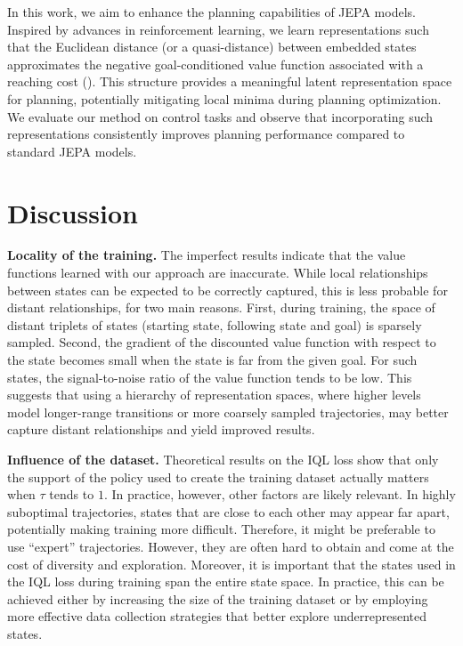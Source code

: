 \documentclass{article} %
\begin{document}
In this work, we aim to enhance the planning capabilities of JEPA models. Inspired by advances in reinforcement learning, we learn representations such that the Euclidean distance (or a quasi-distance) between embedded states approximates the negative goal-conditioned value function associated with a reaching cost (\cite{hilp,park2024hiqlofflinegoalconditionedrl,wang2023optimalgoalreachingreinforcementlearning}). This structure provides a meaningful latent representation space for planning, potentially mitigating local minima during planning optimization. We evaluate our method on control tasks and observe that incorporating such representations consistently improves planning performance compared to standard JEPA models.








\section{Discussion}

\noindent \textbf{Locality of the training.} The imperfect results indicate that the value functions learned with our approach are inaccurate. While local relationships between states can be expected to be correctly captured, this is less probable for distant relationships, for two main reasons. First, during training, the space of distant triplets of states (starting state, following state and goal) is sparsely sampled. Second, the gradient of the discounted value function with respect to the state becomes small when the state is far from the given goal. For such states, the signal-to-noise ratio of the value function tends to be low. This suggests that using a hierarchy of representation spaces, where higher levels model longer-range transitions or more coarsely sampled trajectories, may better capture distant relationships and yield improved results.

\noindent \textbf{Influence of the dataset.} Theoretical results on the IQL loss show that only the support of the policy used to create the training dataset actually matters when $\tau$ tends to $1$. In practice, however, other factors are likely relevant. In highly suboptimal trajectories, states that are close to each other may appear far apart, potentially making training more difficult. Therefore, it might be preferable to use ``expert'' trajectories. However, they are often hard to obtain and come at the cost of diversity and exploration. Moreover, it is important that the states used in the IQL loss during training span the entire state space. In practice, this can be achieved either by increasing the size of the training dataset or by employing more effective data collection strategies that better explore underrepresented states.
\end{document}
